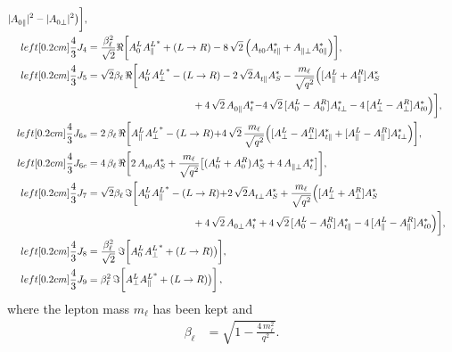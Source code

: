 \begin{align}
      |A_{0\parallel}^{}|^2 - |A_{0\perp}^{}|^2 \big) \bigg],
\\left\lbrack0.2cm]
  \frac{4}{3} J_4 & =
    \frac{\beta_\ell^2}{\sqrt{2}} \Re \bigg[\azeL^{}\apaL^* + (L\to R) 
    - 8 \, \sqrt{2}\, \Big(A_{t0}^{} A_{t\parallel}^*
                         + A_{\parallel\perp}^{} A_{0\parallel}^* \Big) \bigg],
\\left\lbrack0.2cm]
  \frac{4}{3} J_5 & =
    \sqrt{2}\beta_\ell\, \Re \bigg[\azeL^{}\apeL^* - (L\to R)
      - 2\, \sqrt{2} A_{t\parallel}^{}  A_S^*
      - \frac{m_\ell}{\sqrt{q^2}} \Big( [\apaL + \apaR] A_S^* 
\\ \nonumber & \hspace{3.7cm}
      + 4\, \sqrt{2}\, A_{0\parallel}^{} A_t^{*} 
      {
      - 4\, \sqrt{2}\, [\azeL - \azeR]^{} A_{t\perp}^*}
      - 4\, [\apeL - \apeR] A_{t0}^* \Big) \bigg],
\\left\lbrack0.2cm]
  \frac{4}{3} J_{6s} & =
    2\,\beta_\ell\, \Re \bigg[\apaL^{}\apeL^* - (L\to R)
    {
    + 4\, \sqrt{2}\, \frac{ m_\ell}{\sqrt{q^2}} \Big(
[\apeL - \apeR] A_{t\parallel}^* + [\apaL - \apaR] A_{t\perp}^*}
   \Big) \bigg],
\\left\lbrack0.2cm]
  \label{eq:j6c}
  \frac{4}{3} J_{6c} & =
    4\, \beta_\ell\, \Re \bigg[ 2\, A_{t0}^{} A_S^* +
      \frac{m_\ell}{\sqrt{q^2}} \big[(\azeL + \azeR) A_S^* 
           + 4\, A_{\parallel\perp}^{} A_t^* \big] \bigg],
\\left\lbrack0.2cm]
  \frac{4}{3} J_7 & = \label{eq:J7}
    \sqrt{2} \beta_\ell\, \Im \bigg[ \azeL^{}\apaL^* - (L\to R)
      {
      + 2\, \sqrt{2} A_{t\perp}^{}  A_S^*}
      + \frac{m_\ell}{\sqrt{q^2}} \Big( [\apeL + \apeR] A_S^* 
\\ \nonumber & \hspace{3.7cm}
      + 4\, \sqrt{2}\, A_{0\perp}^{} A_t^{*} 
      + 4\, \sqrt{2}\, [\azeL - \azeR]^{} A_{t\parallel}^{*}
      - 4\, [\apaL - \apaR] A_{t0}^* \Big)\bigg],
\\left\lbrack0.2cm]
  \frac{4}{3} J_8 & = 
    \frac{\beta_\ell^2}{\sqrt{2}}\, \Im \bigg[
     \azeL^{}\apeL^* + (L\to R) \big) \bigg],
\\left\lbrack0.2cm]
  \frac{4}{3} J_9 & =
    \beta_\ell^2\, \Im \bigg[\apeL \apaL^{*} + (L\to R) \big) \bigg]\,,
\end{align}
where the lepton mass $m_\ell$ has been kept and 
\begin{align}
 \beta_\ell & = \sqrt{1 - \frac{4\, m_\ell^2}{q^2}}.
\end{align}

